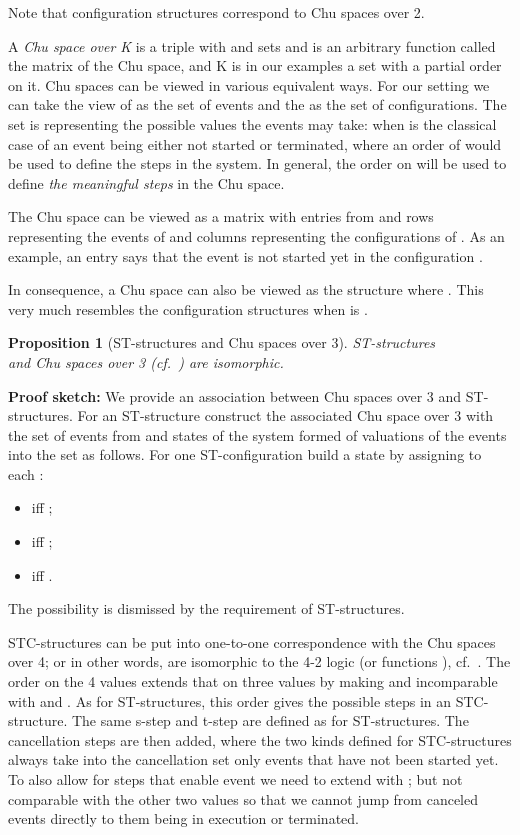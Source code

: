 \documentclass[submission,copyright,creativecommons]{eptcs}
\newtheorem{proposition}[theorem]{Proposition}
\newenvironment{proof}[1][\!\!\,]{\vspace{1ex}\noindent\textbf{Proof #1: }}{\hfill\vspace{2ex}}
\newcounter{case}
\begin{document}
Note that configuration structures \cite{GlabbeekP95config,GlabbeekP09configStruct} correspond to Chu spaces over 2.

A \textit{Chu space over K} is a triple  with  and  sets and  is an arbitrary function called the matrix of the Chu space, and K is in our examples a set with a partial order on it. Chu spaces can be viewed in various equivalent ways. For our setting we can take the view of  as the set of events and the  as the set of configurations. The set  is representing the possible values the events may take: when  is the classical case of an event being either not started or terminated, where an order of  would be used to define the steps in the system. In general, the order on  will be used to define \textit{the meaningful steps} in the Chu space.

The Chu space can be viewed as a matrix with entries from  and rows representing the events of  and columns representing the configurations of . As an example, an entry  says that the event  is not started yet in the configuration .

In consequence, a Chu space can also be viewed as the structure  where . This very much resembles the configuration structures when  is .

\begin{proposition}[ST-structures and Chu spaces over 3]\label{prop_STstructChu3}
ST-structures \\and \emph{Chu spaces over 3} (cf.\ \cite[Sec.3]{Pratt00HDArev}) are isomorphic. 
\end{proposition}

\begin{proof}[sketch]
We provide an association between Chu spaces over 3 and ST-structures.
For an ST-structure  construct the associated Chu space over 3  with  the set of events from  and  states of the system formed of valuations of the events into the set  as follows. For one ST-configuration  build a state  by assigning to each : 
\begin{itemize}
\item  iff ;
\item  iff ;
\item  iff .
\end{itemize}
The possibility  is dismissed by the requirement  of ST-structures.
\end{proof}



STC-structures can be put into one-to-one correspondence with the Chu spaces over 4; or in other words, are isomorphic to the 4-2 logic (or functions ), cf.\ \cite{Pratt03trans_cancel}.
The order on the 4 values  extends that on three values by making  and incomparable with  and . As for ST-structures, this order gives the possible steps in an STC-structure. The same s-step and t-step are defined as for ST-structures. The cancellation steps are then added, where the two kinds defined for STC-structures always take into the cancellation set only events that have not been started yet. 
To also allow for steps that enable event we need to extend with ; but not comparable with the other two values so that we cannot jump from canceled events directly to them being in execution or terminated.
\end{document}
